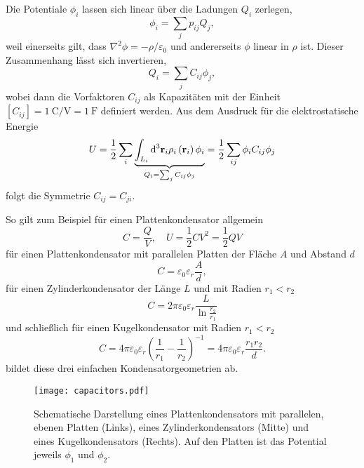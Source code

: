 
Die Potentiale $\phi _{i}$ lassen sich linear über die Ladungen $Q_{i}$ zerlegen,
\begin{equation*}
	\phi _{i}=\sum _{j}p_{ij}Q_{j},
\end{equation*}
weil einerseits gilt, dass $\nabla ^{2}\phi =-\rho /\varepsilon _{0}$ und andererseits $\phi $ linear in $\rho $ ist. Dieser Zusammenhang lässt sich invertieren,
\begin{equation*}
	Q_{i}=\sum _{j}C_{ij}\phi _{j},
\end{equation*}
wobei dann die Vorfaktoren $C_{ij}$ als Kapazitäten mit der Einheit $\left[C_{ij}\right]=\SI{1}{\coulomb\per\V}=\SI{1}{\farad}$ definiert werden. Aus dem Ausdruck für die elektrostatische Energie
\begin{equation*}
	U=\frac{1}{2}\sum _{i}\underset{Q_{i}=\sum _{j}C_{ij}\phi _{j}}{\underbrace{\int _{L_{i}}\text{d} ^{3}\mathbf{r}_{i}\rho _{i}\left(\mathbf{r}_{i}\right)\phi _{i}}}=\frac{1}{2}\sum _{ij}\phi _{i}C_{ij}\phi _{j}
\end{equation*}
folgt die Symmetrie $C_{ij}=C_{ji}$.

So gilt zum Beispiel für einen Plattenkondensator allgemein
\begin{equation*}
	C=\frac{Q}{V},\quad U=\frac{1}{2}CV^{2}=\frac{1}{2}QV
\end{equation*}
für einen Plattenkondensator mit parallelen Platten der Fläche $A$ und Abstand $d$
\begin{equation*}
	C=\varepsilon _{0}\varepsilon _{r}\frac{A}{d},
\end{equation*}
für einen Zylinderkondensator der Länge $L$ und mit Radien $r_{1}<r_{2}$
\begin{equation*}
	C=2\pi \varepsilon _{0}\varepsilon _{r}\frac{L}{\ln \frac{r_{2}}{r_{1}}}
\end{equation*}
und schließlich für einen Kugelkondensator mit Radien $r_{1}<r_{2}$
\begin{equation*}
	C=4\pi \varepsilon _{0}\varepsilon _{r}\left(\frac{1}{r_{1}}-\frac{1}{r_{2}}\right)^{-1}=4\pi \varepsilon _{0}\varepsilon _{r}\frac{r_{1}r_{2}}{d}.
\end{equation*}
 bildet diese drei einfachen Kondensatorgeometrien ab. 


\begin{figure}[htb]
	\centering
	\texttt{[image: capacitors.pdf]}
	\caption{Schematische Darstellung eines Plattenkondensators mit parallelen, ebenen Platten (Links), eines Zylinderkondensators (Mitte) und eines Kugelkondensators (Rechts). Auf den Platten ist das Potential jeweils $\phi_1$ und $\phi_2$. }
	\label{fig:capacitors}
\end{figure}



